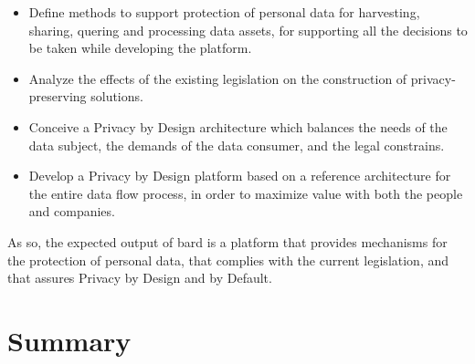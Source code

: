 \begin{itemize}
	\setlength\itemsep{1em}
	\item Define methods to support protection of personal data for harvesting, sharing, quering and processing data assets, for supporting all the decisions to be taken while developing the platform.
	\item Analyze the effects of the existing legislation on the construction of privacy-preserving solutions.
	\item Conceive a Privacy by Design architecture which balances the needs of the data subject, the demands of the data consumer, and the legal constrains.
	\item Develop a Privacy by Design platform based on a reference architecture for the entire data flow process, in order to maximize value with both the people and companies.
\end{itemize}

As so, the expected output of \ac{bard} is a platform that provides mechanisms for the protection of personal data, that complies with the current legislation, and that assures Privacy by Design and by Default.






  
\section{Summary}
\label{sec:SummaryBARD}



